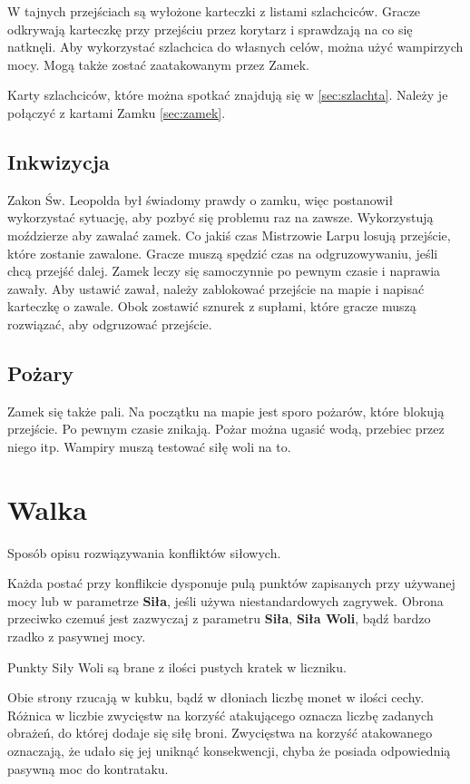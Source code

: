 		W tajnych przejściach są wyłożone karteczki z listami szlachciców.
		Gracze odkrywają karteczkę przy przejściu przez korytarz i sprawdzają na co się natknęli.
		Aby wykorzystać szlachcica do własnych celów, można użyć wampirzych mocy.
		Mogą także zostać zaatakowanym przez Zamek.
		
		Karty szlachciców, które można spotkać znajdują się w \ref{sec:szlachta}.
		Należy je połączyć z kartami Zamku \ref{sec:zamek}.
		
	\subsection{Inkwizycja}
		Zakon Św. Leopolda był świadomy prawdy o zamku, więc postanowił wykorzystać sytuację, aby pozbyć się problemu raz na zawsze.
		Wykorzystują moździerze aby zawalać zamek.
		Co jakiś czas Mistrzowie Larpu losują przejście, które zostanie zawalone.
		Gracze muszą spędzić czas na odgruzowywaniu, jeśli chcą przejść dalej.
		Zamek leczy się samoczynnie po pewnym czasie i naprawia zawały.
		Aby ustawić zawał, należy zablokować przejście na mapie i napisać karteczkę o zawale.
		Obok zostawić sznurek z supłami, które gracze muszą rozwiązać, aby odgruzować przejście.

	\subsection{Pożary}
		Zamek się także pali. Na początku na mapie jest sporo pożarów, które blokują przejście.
		Po pewnym czasie znikają.
		Pożar można ugasić wodą, przebiec przez niego itp.
		Wampiry muszą testować siłę woli na to.

\section{Walka}
	Sposób opisu rozwiązywania konfliktów siłowych.
	
	Każda postać przy konflikcie dysponuje pulą punktów zapisanych przy używanej mocy lub w parametrze \textbf{Siła}, jeśli używa niestandardowych zagrywek.
	Obrona przeciwko czemuś jest zazwyczaj z parametru \textbf{Siła}, \textbf{Siła Woli}, bądź bardzo rzadko z pasywnej mocy.
	
	Punkty Siły Woli są brane z ilości pustych kratek w liczniku.
	
	Obie strony rzucają w kubku, bądź w dłoniach liczbę monet w ilości cechy.
	Różnica w liczbie zwycięstw na korzyść atakującego oznacza liczbę zadanych obrażeń, do której dodaje się siłę broni.
	Zwycięstwa na korzyść atakowanego oznaczają, że udało się jej uniknąć konsekwencji, chyba że posiada odpowiednią pasywną moc do kontrataku.
	
